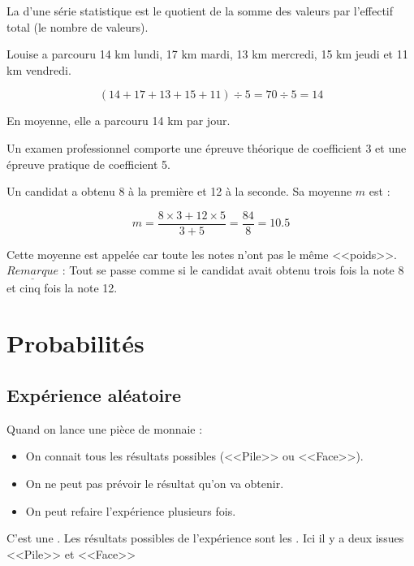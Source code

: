 \documentclass[12pt,a4paper]{article}
\begin{document}
\begin{mydef}
	La  d'une série statistique est le quotient de la somme des valeurs par l'effectif total (le nombre de valeurs).
\end{mydef}

\begin{myex}
	Louise a parcouru 14 km lundi, 17 km mardi, 13 km mercredi, 15 km jeudi et 11 km vendredi.
	
	\begin{equation}
		(14 + 17 + 13 + 15 + 11) \div 5  = 70 \div 5 = 14
	\end{equation}
	
	En moyenne, elle a parcouru 14 km par jour.
\end{myex}

\begin{myex}
	Un examen professionnel comporte une épreuve théorique de coefficient 3 et une épreuve pratique de coefficient 5.
	
	Un candidat a obtenu 8 à la première et 12 à la seconde. Sa moyenne $m$ est :
	
	\begin{equation*}
		m = \dfrac{8 \times 3 + 12 \times 5}{3+5}=\dfrac{84}{8} = \num{10.5}
	\end{equation*}
	
	Cette moyenne est appelée  car toute les notes n'ont pas le même <<poids>>.\\
	
	
	$\underline{Remarque}$ : Tout se passe comme si le candidat avait obtenu trois fois la note 8 et cinq fois la note 12.
	
	
\end{myex}

\section{Probabilités}

\subsection{Expérience aléatoire}

\begin{myex}
	Quand on lance une pièce de monnaie :
	\begin{itemize}
		\item On connait tous les résultats possibles (<<Pile>> ou <<Face>>).
		\item On ne peut pas prévoir le résultat qu'on va obtenir.
		\item On peut refaire l'expérience plusieurs fois.
	\end{itemize}

	C'est une . Les résultats possibles de l'expérience sont les . Ici il y a deux issues <<Pile>> et <<Face>>
\end{myex}
\end{document}
